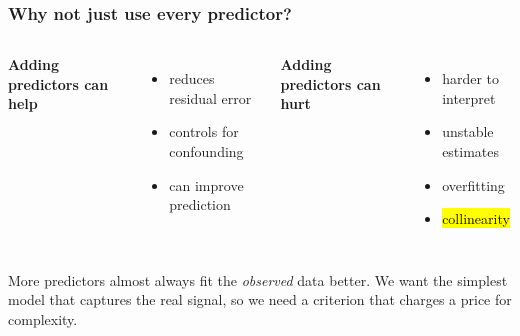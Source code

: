 \documentclass[slidestop,compress,mathserif]{beamer}
\begin{document}
\begin{frame}
\frametitle{Why not just use every predictor?}

\begin{columns}[T]
\textbf{Adding predictors can help}
\begin{itemize}
\item reduces residual error
\item controls for confounding
\item can improve prediction
\end{itemize}

\textbf{Adding predictors can hurt}
\begin{itemize}
\item harder to interpret
\item unstable estimates
\item overfitting
\item \hl{collinearity}
\end{itemize}
\end{columns}

\vspace{0.6em}
More predictors almost always fit the \emph{observed} data better. We want the simplest model that captures the real signal, so we need a criterion that charges a price for complexity.

\end{frame}
\end{document}
